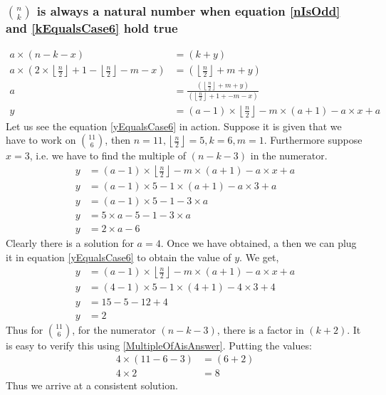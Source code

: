 \documentclass[10pt, twoside]{article}
\newcommand*{\Combination}[2]{\binom{#1}{#2}}%
\newcommand{\floordivision}[2]{\left\lfloor \frac{#1}{#2} \right\rfloor}
\begin{document}
\subsubsection{$\Combination{n}{k}$ is always a natural number when equation \eqref{nIsOdd} and \eqref{kEqualsCase6} hold true}\label{ProofkEqualsCase6}
\begin{align}
	a \times (n-k-x) &= (k+y) \nonumber \\
	a \times (2\times \floordivision{n}{2} + 1 - \floordivision{n}{2} -m - x) &= (\floordivision{n}{2} +m + y) \nonumber \\
	a &= \frac{(\floordivision{n}{2} +m  + y)}{(\floordivision{n}{2} + 1 +-m - x)} \nonumber \\
	y &= (a-1)\times \floordivision{n}{2} -m\times(a+1) - a\times x + a \label{yEqualsCase6}	
\end{align}
Let us see the equation \eqref{yEqualsCase6} in action. \newline
Suppose it is given that we have to work on $\Combination{11}{6}$, then $n=11,\floordivision{n}{2}=5,k=6,m=1$. Furthermore suppose $x=3$, i.e. we have to find the multiple of $(n-k-3)$ in the numerator.
\begin{align*}
	y &= (a-1)\times \floordivision{n}{2} -m\times(a+1) - a\times x + a \\
	y &= (a-1)\times 5 - 1\times(a+1) - a\times 3 + a \\
	y &= (a-1)\times 5 -1 -3\times a \\
	y &= 5\times a - 5 -1 -3\times a \\
	y &= 2\times a - 6
\end{align*}
Clearly there is a solution for $a = 4$. Once we have obtained, a then we can plug it in equation \eqref{yEqualsCase6} to obtain the value of $y$. We get,
\begin{align*}
	y &= (a-1)\times \floordivision{n}{2} -m\times(a+1) - a\times x + a \\
	y &= (4-1)\times 5 -1\times(4+1) - 4\times 3 + 4 \\
	y &= 15 - 5 -12 + 4 \\
	y &= 2
\end{align*}
Thus for $\Combination{11}{6}$, for the numerator $(n-k-3)$, there is a factor in $(k+2)$. It is easy to verify this using \eqref{MultipleOfAisAnswer}. Putting the values:
\begin{align*}
	4\times(11-6-3) &= (6+2)\\
	4\times 2 &= 8
\end{align*}
Thus we arrive at a consistent solution.\newline
\end{document}
